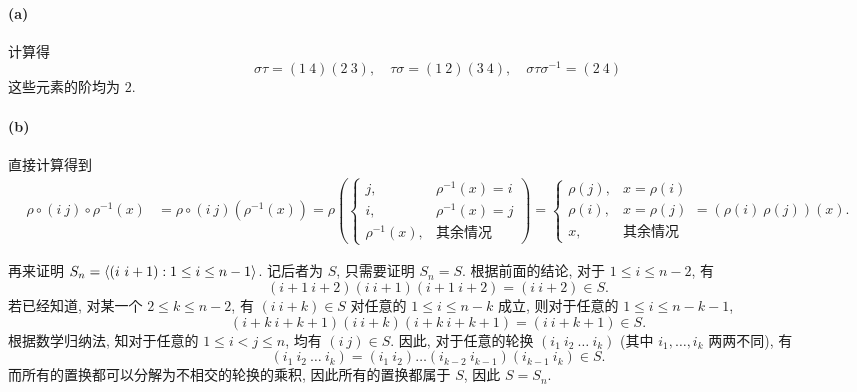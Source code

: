 \documentclass{article}
\begin{document}
\begin{solution}
	\paragraph{(a)} 计算得
	\[ \sigma\tau = (1\ 4)(2\ 3), \quad 
	\tau\sigma = (1\ 2)(3\ 4),\quad 
	\sigma\tau\sigma^{-1} = (2\ 4) \]
	这些元素的阶均为 $2$.

	\paragraph{(b)} 直接计算得到
	\begin{align*}
		\rho \circ  (i\ j) \circ \rho^{-1}(x)
		&= \rho \circ (i\ j) (\rho^{-1}(x)) 
		= \rho \left( \begin{cases}
			j, & \rho^{-1}(x) = i \\
			i, & \rho^{-1}(x) = j \\
			\rho^{-1}(x), & \text{其余情况}
		\end{cases} \right)
		= \begin{cases}
			\rho(j), & x = \rho(i) \\
			\rho(i), & x = \rho(j) \\
			x, & \text{其余情况}
		\end{cases}
		=(\rho(i)\ \rho(j))(x).
	\end{align*}

	再来证明 $S_n = \left\langle (i\ i+1): 1\le i\le n-1 \right\rangle$. 记后者为 $S$, 只需要证明 $S_n = S$. 根据前面的结论, 对于 $1\le i \le n-2$, 有
	\[ (i+1\ i+2)(i\ i+1)(i+1\ i+2) = (i\ i+2) \in S. \]
	若已经知道, 对某一个 $2\le k\le n-2$, 有 $(i\ i+k)\in S$ 对任意的 $1\le i\le n-k$ 成立, 则对于任意的 $1\le i\le n-k-1$,
	\[ (i+k\ i+k+1)(i\ i+k)(i+k\ i+k+1) = (i\ i+k+1) \in S. \]
	根据数学归纳法, 知对于任意的 $1\le i<j\le n$, 均有 $(i\ j)\in S$. 因此, 对于任意的轮换 $(i_1\ i_2\ \dots\ i_k)$ (其中 $i_1, \dots, i_k$ 两两不同), 有
	\[ (i_1\ i_2\ \dots\ i_k) = (i_1\ i_2)\dots(i_{k-2}\ i_{k-1})(i_{k-1}\ i_k) \in S. \]
	而所有的置换都可以分解为不相交的轮换的乘积, 因此所有的置换都属于 $S$, 因此 $S=S_{n}$.
\end{solution}
\end{document}
